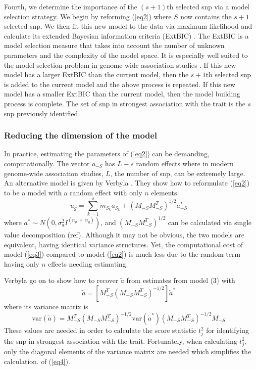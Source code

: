 \documentclass{nature}
\begin{document}
Fourth, we determine the importance of the $(s+1)$th selected snp via a model selection strategy. 
We begin by reforming (\ref{eq2}) where $S$ now contains the $s + 1$ selected snp.  We then fit this new model to the data
via maximum likelihood and calculate its extended Bayesian information criteria (ExtBIC) \cite{chen2008extended}.  The ExtBIC is a model selection measure that takes into account the number of unknown parameters and the complexity 
of the model space.  It is especially well suited to the model selection problem in genome-wide association studies \cite{chen2008extended}. If this new model has a larger ExtBIC than the current model, then the $s+1$th selected snp is added to 
the current model and the above process is repeated. If this new model has a smaller ExtBIC than the current model, then the 
model building process is complete. The set of snp in strongest association with the trait is the $s$ snp previously identified. 

\subsubsection{Reducing the dimension of the model}
In practice, estimating the parameters of (\ref{eq2}) can be demanding, computationally. 
The vector $a_{-S}$ has $L-s$ random effects where in modern genome-wide association studies, 
$L$, the number of snp, can be extremely large.  An alternative model is given by 
Verbyla \cite{verbyla2012rwgaim,verbyla2014whole}. 
They show how to reformulate (\ref{eq2}) to be a model with a random effect with only $n$ elements
\begin{equation}
\label{eq3}
u_g = \sum_{k=1}^s  m_{S_k} a_{S_k} + (M_{-S} M_{-S}^T)^{1/2} a^*_{-S}
\end{equation}
where $a^* \sim N(0, \sigma_a^2 I^{(n_g \; \times \;  n_g)})$, and 
$(M_{-S} M_{-S}^T)^{1/2}$ can be calculated via single value decomposition (ref).  
Although it may not be obvious, the two models are equivalent, 
having identical variance structures. Yet, the computational cost of model (\ref{eq3}) compared to 
model (\ref{eq2}) is much less due to the random term having only $n$ effects needing estimating. 

Verbyla \cite{verbyla2012rwgaim,verbyla2014whole} go on to show how to recover $\widetilde{a}$ from estimates from model (3) with 
\begin{equation}
\widetilde{a} = \left [ M_{-S}^T (M_{-S} M_{-S}^T)^{-1/2} \right ] \widetilde{a}^*
\end{equation}
where its variance matrix is
\begin{equation}
\label{eq4}
\textrm{var}(\widetilde{a}) = M_{-S}^T (M_{-S} M_{-S}^T)^{-1/2} \textrm{var}(\widetilde{a}^*) (M_{-S} M_{-S}^T)^{-1/2} M_{-S}
\end{equation}
These values are needed in order to calculate the score statistic $t_j^2$ for identifying the snp in strongest association with the trait. 
Fortunately, when calculating $t_j^2$, only the diagonal elements of the variance matrix are needed which simplifies the  calculation. 
of (\ref{eq4}). 
\end{document}
